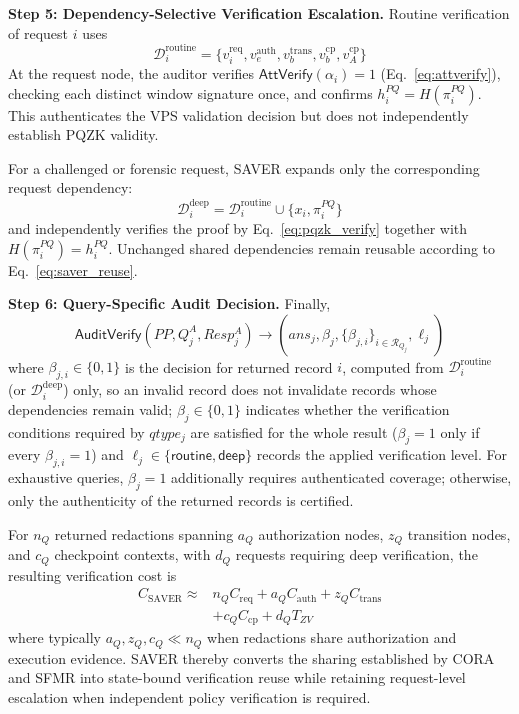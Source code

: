 \documentclass[lettersize,journal]{IEEEtran}
\begin{document}
\medskip
\noindent\textbf{Step 5: Dependency-Selective Verification Escalation.}
Routine verification of request $i$ uses
\begin{equation}
\mathcal{D}_i^{\mathrm{routine}}
=
\{
v_i^{\mathrm{req}},
v_e^{\mathrm{auth}},
v_b^{\mathrm{trans}},
v_b^{\mathrm{cp}},
v_A^{\mathrm{cp}}
\}
\end{equation}
At the request node, the auditor verifies
$\mathsf{AttVerify}(\alpha_i)=1$
(Eq.~\eqref{eq:attverify}), checking each distinct window signature
once,
and confirms $h_i^{PQ}=H(\pi_i^{PQ})$. This authenticates the VPS
validation decision but does not independently establish PQZK validity.

For a challenged or forensic request, SAVER expands only the
corresponding request dependency:
\begin{equation}
\mathcal{D}_i^{\mathrm{deep}}
=
\mathcal{D}_i^{\mathrm{routine}}
\cup
\{x_i,\pi_i^{PQ}\}
\end{equation}
and independently verifies the proof by
Eq.~\eqref{eq:pqzk_verify} together with $H(\pi_i^{PQ})=h_i^{PQ}$.
Unchanged shared dependencies remain reusable according to
Eq.~\eqref{eq:saver_reuse}.

\medskip
\noindent\textbf{Step 6: Query-Specific Audit Decision.}
Finally,
\begin{equation}
\mathsf{AuditVerify}
(PP,Q_j^A,Resp_j^A)
\rightarrow
(ans_j,\beta_j,\{\beta_{j,i}\}_{i\in\mathcal{R}_{Q_j}},\ell_j)
\end{equation}
where $\beta_{j,i}\in\{0,1\}$ is the decision for returned
record $i$, computed from $\mathcal{D}_i^{\mathrm{routine}}$ (or
$\mathcal{D}_i^{\mathrm{deep}}$) only, so an invalid record does not
invalidate records whose dependencies remain valid;
$\beta_j\in\{0,1\}$ indicates whether the verification conditions
required by $qtype_j$ are satisfied for the whole result
($\beta_j=1$ only if every $\beta_{j,i}=1$) and
$\ell_j\in\{\mathsf{routine},\mathsf{deep}\}$ records the applied
verification level. For exhaustive queries, $\beta_j=1$ additionally
requires authenticated coverage; otherwise, only the authenticity of
the returned records is certified.

For $n_Q$ returned redactions spanning $a_Q$ authorization nodes,
$z_Q$ transition nodes, and $c_Q$ checkpoint contexts, with $d_Q$
requests requiring deep verification, the resulting verification cost is
\begin{equation}
\begin{aligned}
C_{\mathrm{SAVER}}
\approx{}&
n_QC_{\mathrm{req}}
+a_QC_{\mathrm{auth}}
+z_QC_{\mathrm{trans}}\\
&+c_QC_{\mathrm{cp}}
+d_QT_{ZV}
\end{aligned}
\label{eq:saver_cost}
\end{equation}
where typically $a_Q,z_Q,c_Q\ll n_Q$ when redactions share
authorization and execution evidence. SAVER thereby converts the sharing established by
CORA and SFMR into state-bound verification reuse while retaining
request-level escalation when independent policy verification is
required.
\end{document}
